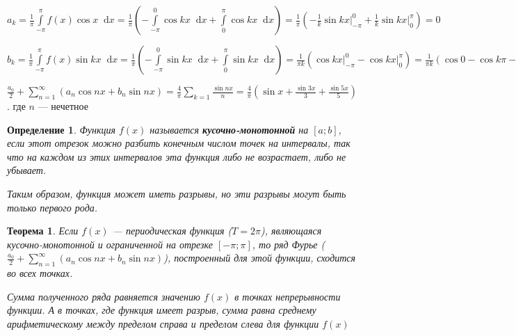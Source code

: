 \documentclass{article}
\newcommand*\diff{\mathop{}\!\mathrm{d}}
\newtheorem{definition}{Определение}
\newtheorem{theorem}{Теорема}
\begin{document}
$a_{k} = \frac{1}{\pi} \int\limits_{-\pi}^{\pi} f(x) \cos x \diff x = \frac{1}{\pi} (-\int\limits_{-\pi}^{0} \cos k x \diff x + \int\limits_{0}^{\pi} \cos k x \diff x) = \frac{1}{\pi} (-\frac{1}{k} \sin k x \bigg|^{0}_{-\pi} + \frac{1}{k} \sin k x \bigg|_{0}^{\pi}) = 0$

$b_{k} = \frac{1}{\pi} \int\limits_{-\pi}^{\pi} f(x) \sin k x \diff x = \frac{1}{\pi} (-\int\limits_{-\pi}^{0} \sin k x \diff x + \int\limits_{0}^{\pi} \sin k x \diff x) = \frac{1}{\pi k} (\cos k x \bigg|_{-\pi}^{0} - \cos k x \bigg|_{0}^{\pi}) = \frac{1}{\pi k} (\cos 0 - \cos k \pi - \cos k \pi + \cos 0) = \frac{1}{\pi k} (1 - \cos k \pi - \cos k \pi + 1) = \begin{cases}
    0, k \text{ — четное} \\
    \frac{4}{\pi k}, k \text{ — нечетное}
\end{cases}$

$\frac{a_0}{2} + \sum\limits_{n = 1}^{\infty} (a_{n} \cos n x + b_{n} \sin n x) = \frac{4}{\pi} \sum\limits_{k = 1} \frac{\sin n x}{n} = \frac{4}{\pi} (\sin x + \frac{\sin 3 x}{3} + \frac{\sin 5 x}{5})$. где $n$ — нечетное

\hfill

\begin{definition}

Функция $f(x)$ называется \textbf{кусочно-монотонной} на $[a; b]$, если этот отрезок можно разбить конечным числом точек на интервалы, так что на каждом из этих интервалов эта функция либо не возрастает, либо не убывает.

Таким образом, функция может иметь разрывы, но эти разрывы могут быть только первого рода.

\end{definition}

\begin{theorem}

Если $f(x)$ — периодическая функция ($T = 2 \pi$), являющаяся кусочно-монотонной и ограниченной на отрезке $[-\pi; \pi]$, то ряд Фурье ($\frac{a_0}{2} + \sum\limits_{n = 1}^{\infty} (a_{n} \cos n x + b_{n} \sin n x)$), построенный для этой функции, сходится во всех точках.

Сумма полученного ряда равняется значению $f(x)$ в точках непрерывности функции. А в точках, где функция имеет разрыв, сумма равна среднему арифметическому между пределом справа и пределом слева для функции $f(x)$

\end{theorem}
\end{document}
